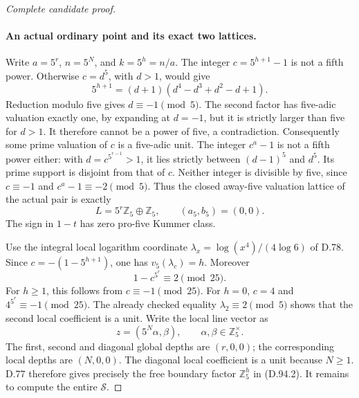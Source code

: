 \begin{proof}[Complete candidate proof]
\paragraph{An actual ordinary point and its exact two lattices.}
Write \(a=5^r\), \(n=5^N\), and \(k=5^h=n/a\).
The integer \(c=5^{h+1}-1\) is not a fifth power. Otherwise
\(c=d^5\), with \(d>1\), would give
\[
 5^{h+1}=(d+1)(d^4-d^3+d^2-d+1).
\]
Reduction modulo five gives \(d\equiv-1\pmod5\). The second
factor has five-adic valuation exactly one, by expanding at
\(d=-1\), but it is strictly larger than five for \(d>1\).
It therefore cannot be a power of five, a contradiction.
Consequently some prime valuation of \(c\) is a five-adic unit.
The integer \(c^a-1\) is not a fifth power either: with
\(d=c^{5^{r-1}}>1\), it lies strictly between \((d-1)^5\)
and \(d^5\). Its prime support is disjoint from that of \(c\).
Neither integer is divisible by five, since \(c\equiv-1\) and
\(c^a-1\equiv-2\pmod5\). Thus the closed away-five valuation
lattice of the actual pair is exactly
\[
             L=5^r\mathbb Z_5\oplus\mathbb Z_5,
                    \qquad (a_5,b_5)=(0,0).            \tag{D.94.3}
\]
The sign in \(1-t\) has zero pro-five Kummer class.

Use the integral local logarithm coordinate
\(\lambda_x=\log(x^4)/(4\log6)\) of D.78. Since
\(c=-(1-5^{h+1})\), one has
\(v_5(\lambda_c)=h\). Moreover
\[
                 1-c^{5^r}\equiv2\pmod{25}.           \tag{D.94.4}
\]
For \(h\ge1\), this follows from \(c\equiv-1\pmod{25}\).
For \(h=0\), \(c=4\) and \(4^{5^r}\equiv-1\pmod{25}\).
The already checked equality \(\lambda_2\equiv2\pmod5\)
shows that the second local coefficient is a unit. Write the
local line vector as
\[
        z=(5^N\alpha,\beta),\qquad
                       \alpha,\beta\in\mathbb Z_5^\times.
                                                        \tag{D.94.5}
\]
The first, second and diagonal global depths are \((r,0,0)\);
the corresponding local depths are \((N,0,0)\). The diagonal
local coefficient is a unit because \(N\ge1\). D.77 therefore
gives precisely the free boundary factor \(\mathbb Z_5^h\)
in (D.94.2). It remains to compute the entire \(\mathcal S\).


\end{proof}
